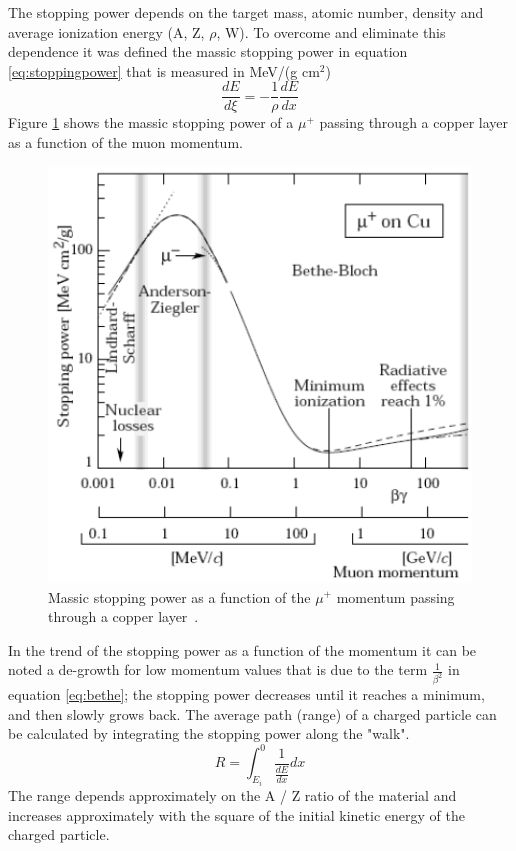 \noindent The stopping power depends on the target mass, atomic number, density and average ionization energy (A, Z, $\rho$, W). To overcome and eliminate this dependence it was defined the massic stopping power in equation \ref{eq:stoppingpower} that is measured in MeV/(g cm${}^2$)
\begin{equation}\label{eq:stoppingpower}
	\frac{dE}{d \xi} = - \frac{1}{\rho} \frac{dE}{dx}
\end{equation}
\noindent Figure \ref{fig:massicstoppingpower} shows the massic stopping power of a $\mu^+$ passing through a copper layer as a function of the muon momentum.
\begin{figure}[H]
	\centering
	\includegraphics[width=0.7\linewidth]{IMG/ch1/MassicStoppingPower}
	\caption{Massic stopping power as a function of the $\mu^+$ momentum passing through a copper layer~\cite{PDG}.}
	\label{fig:massicstoppingpower}
\end{figure}
\noindent In the trend of the stopping power as a function of the momentum it can be noted a de-growth for low momentum values that is due to the term $\frac{1}{\beta^2}$ in equation \ref{eq:bethe}; the stopping power decreases until it reaches a minimum, and then slowly grows back.
\newline
The average path (range) of a charged particle can be calculated by integrating the stopping power along the "walk".
\begin{equation}\label{eq:range}
	R=\int_{E_i}^{0} \frac{1}{\frac{dE}{dx}}dx
\end{equation}
\noindent The range depends approximately on the A / Z ratio of the material and increases approximately with the square of the initial kinetic energy of the charged particle.
